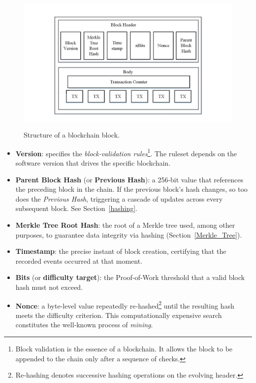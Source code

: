 \begin{figure}[h]
    \centering
    \includegraphics[width=14cm,height=7cm]{Images/Chap1/Block_Structure.png}
    \caption[Structure of a blockchain block]{Structure of a blockchain block.}
    \label{block_structure_img}
\end{figure}
\begin{itemize}
    \item \textbf{Version}: specifies the \textit{block‑validation rules}\footnote{Block validation is the essence of a blockchain. It allows the block to be appended to the chain only after a sequence of checks. }. The ruleset depends on the software version that drives the specific blockchain.

    \item \textbf{Parent Block Hash} (or \textbf{Previous Hash}): a 256‑bit value that references the preceding block in the chain. If the previous block's hash changes, so too does the \textit{Previous Hash}, triggering a cascade of updates across every subsequent block. See Section~\ref{hashing}.
    \item \textbf{Merkle Tree Root Hash}: the root of a Merkle tree used, among other purposes, to guarantee data integrity via hashing (Section~\ref{Merkle_Tree}).
    \item \textbf{Timestamp}: the precise instant of block creation, certifying that the recorded events occurred at that moment.
    \item \textbf{Bits} (or \textbf{difficulty target}): the Proof‑of‑Work threshold that a valid block hash must not exceed.
    \item \textbf{Nonce}: a byte‑level value repeatedly re‑hashed\footnote{Re‑hashing denotes successive hashing operations on the evolving header.} until the resulting hash meets the difficulty criterion. This computationally expensive search constitutes the well‑known process of \textit{mining}.
\end{itemize}

